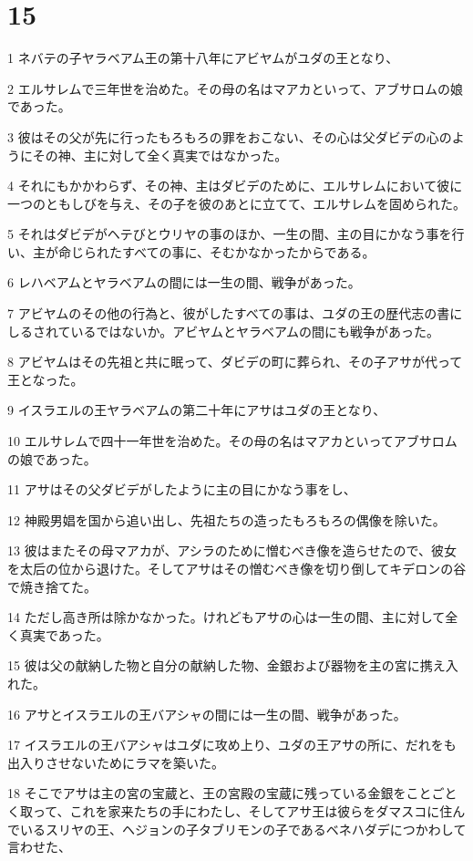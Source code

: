 \chapter{15}

\par 1 ネバテの子ヤラベアム王の第十八年にアビヤムがユダの王となり、
\par 2 エルサレムで三年世を治めた。その母の名はマアカといって、アブサロムの娘であった。
\par 3 彼はその父が先に行ったもろもろの罪をおこない、その心は父ダビデの心のようにその神、主に対して全く真実ではなかった。
\par 4 それにもかかわらず、その神、主はダビデのために、エルサレムにおいて彼に一つのともしびを与え、その子を彼のあとに立てて、エルサレムを固められた。
\par 5 それはダビデがヘテびとウリヤの事のほか、一生の間、主の目にかなう事を行い、主が命じられたすべての事に、そむかなかったからである。
\par 6 レハベアムとヤラベアムの間には一生の間、戦争があった。
\par 7 アビヤムのその他の行為と、彼がしたすべての事は、ユダの王の歴代志の書にしるされているではないか。アビヤムとヤラベアムの間にも戦争があった。
\par 8 アビヤムはその先祖と共に眠って、ダビデの町に葬られ、その子アサが代って王となった。
\par 9 イスラエルの王ヤラベアムの第二十年にアサはユダの王となり、
\par 10 エルサレムで四十一年世を治めた。その母の名はマアカといってアブサロムの娘であった。
\par 11 アサはその父ダビデがしたように主の目にかなう事をし、
\par 12 神殿男娼を国から追い出し、先祖たちの造ったもろもろの偶像を除いた。
\par 13 彼はまたその母マアカが、アシラのために憎むべき像を造らせたので、彼女を太后の位から退けた。そしてアサはその憎むべき像を切り倒してキデロンの谷で焼き捨てた。
\par 14 ただし高き所は除かなかった。けれどもアサの心は一生の間、主に対して全く真実であった。
\par 15 彼は父の献納した物と自分の献納した物、金銀および器物を主の宮に携え入れた。
\par 16 アサとイスラエルの王バアシャの間には一生の間、戦争があった。
\par 17 イスラエルの王バアシャはユダに攻め上り、ユダの王アサの所に、だれをも出入りさせないためにラマを築いた。
\par 18 そこでアサは主の宮の宝蔵と、王の宮殿の宝蔵に残っている金銀をことごとく取って、これを家来たちの手にわたし、そしてアサ王は彼らをダマスコに住んでいるスリヤの王、ヘジョンの子タブリモンの子であるベネハダデにつかわして言わせた、
